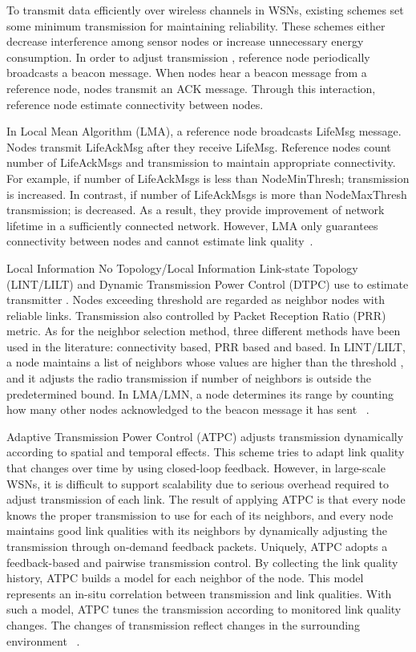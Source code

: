 \documentclass[12pt, conference, compsocconf, onecolumn, draftcls]{IEEEtran}
\begin{document}
To transmit data efficiently over wireless channels in WSNs, existing schemes set some minimum transmission  for maintaining reliability. These schemes either decrease interference among sensor nodes or increase unnecessary energy consumption. In order to adjust transmission , reference node periodically broadcasts a beacon message. When nodes hear a beacon message from a reference node, nodes transmit an ACK message. Through this interaction, reference node estimate connectivity between nodes.

In Local Mean Algorithm (LMA), a reference node broadcasts LifeMsg message. Nodes transmit LifeAckMsg after they receive LifeMsg. Reference nodes count number of LifeAckMsgs and transmission  to maintain appropriate connectivity. For example, if number of LifeAckMsgs is less than NodeMinThresh; transmission  is increased. In contrast, if number of LifeAckMsgs is more than NodeMaxThresh transmission;  is decreased. As a result, they provide improvement of network lifetime in a sufficiently connected network. However, LMA only guarantees connectivity between nodes and cannot estimate link quality~\cite{5}.

Local Information No Topology/Local Information Link-state Topology (LINT/LILT) and Dynamic Transmission Power Control (DTPC) use  to estimate transmitter . Nodes exceeding threshold   are regarded as neighbor nodes with reliable links. Transmission  also controlled by Packet Reception Ratio (PRR) metric. As for the neighbor selection method, three different methods have been used in the literature: connectivity based, PRR based and  based. In LINT/LILT, a node maintains a list of neighbors whose  values are higher than the threshold , and it adjusts the radio transmission  if number of neighbors is outside the predetermined bound. In LMA/LMN, a node determines its range by counting how many other nodes acknowledged to the beacon message it has sent ~\cite{6}.

Adaptive Transmission Power Control (ATPC) adjusts transmission  dynamically according to spatial and temporal effects. This scheme tries to adapt link quality that changes over time by using closed-loop feedback. However, in large-scale WSNs, it is difficult to support scalability due to serious overhead required to adjust transmission  of each link. The result of applying ATPC is that every node knows the proper transmission  to use for each of its neighbors, and every node maintains good link qualities with its neighbors by dynamically adjusting the transmission  through on-demand feedback packets. Uniquely, ATPC adopts a feedback-based and pairwise transmission  control. By collecting the link quality history, ATPC builds a model for each neighbor of the node. This model represents an in-situ correlation between transmission  and link qualities. With such a model, ATPC tunes the transmission  according to monitored link quality changes. The changes of transmission  reflect changes in the surrounding environment ~\cite{7}.
\end{document}
